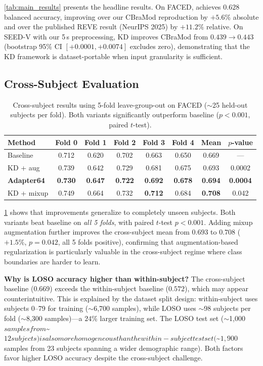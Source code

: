 \cref{tab:main_results} presents the headline results. On FACED, \ours achieves $\mathbf{0.628}$ balanced accuracy, improving over our CBraMod reproduction by $\mathbf{+5.6\%}$ absolute and over the published REVE result (NeurIPS 2025) by $\mathbf{+11.2\%}$ relative. On SEED-V with our 5\,s preprocessing, KD improves CBraMod from $0.439 \to 0.443$ (bootstrap 95\% CI $[+0.0001, +0.0074]$ excludes zero), demonstrating that the KD framework is dataset-portable when input granularity is sufficient.

\subsection{Cross-Subject Evaluation}
\label{sec:cross_subject}
\vspace{-1mm}

\begin{table}[!t]
\caption{Cross-subject results using 5-fold leave-group-out on FACED ($\sim$25 held-out subjects per fold). Both \ours variants significantly outperform baseline ($p < 0.001$, paired $t$-test).}
\small
\centering
\begin{tabular}{lccccccc}
\toprule
Method & Fold 0 & Fold 1 & Fold 2 & Fold 3 & Fold 4 & Mean & $p$-value \\
\midrule
Baseline & 0.712 & 0.620 & 0.702 & 0.663 & 0.650 & 0.669 & --- \\
KD + aug & 0.739 & 0.642 & 0.729 & 0.681 & 0.675 & 0.693 & 0.0002 \\
\rowcolor{blond}
\textbf{Adapter64} & \textbf{0.730} & \textbf{0.647} & \textbf{0.722} & \textbf{0.692} & \textbf{0.678} & \textbf{0.694} & \textbf{0.0004} \\
KD + mixup & 0.749 & 0.664 & 0.732 & \textbf{0.712} & 0.684 & \textbf{0.708} & 0.042 \\
\bottomrule
\end{tabular}
\label{tab:loso}
\end{table}

\cref{tab:loso} shows that improvements generalize to completely unseen subjects. Both \ours variants beat baseline on \emph{all 5 folds}, with paired $t$-test $p < 0.001$. Adding mixup augmentation further improves the cross-subject mean from $0.693$ to $\mathbf{0.708}$ ($+1.5\%$, $p = 0.042$, all 5 folds positive), confirming that augmentation-based regularization is particularly valuable in the cross-subject regime where class boundaries are harder to learn.

\noindent\textbf{Why is LOSO accuracy higher than within-subject?} The cross-subject baseline ($0.669$) exceeds the within-subject baseline ($0.572$), which may appear counterintuitive. This is explained by the dataset split design: within-subject uses subjects 0--79 for training ($\sim$6{,}700 samples), while LOSO uses $\sim$98 subjects per fold ($\sim$8{,}300 samples)---a $24\%$ larger training set. The LOSO test set ($\sim$1{,}000$ samples from $\sim$12 subjects) is also more homogeneous than the within-subject test set ($\sim$1{,}900$ samples from 23 subjects spanning a wider demographic range). Both factors favor higher LOSO accuracy despite the cross-subject challenge.

